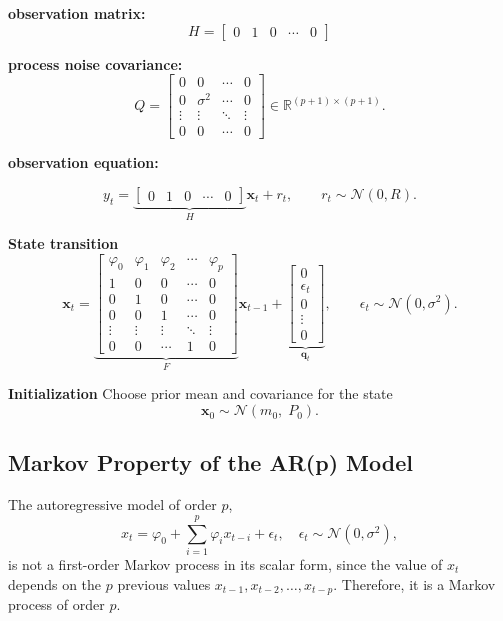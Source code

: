 \textbf{observation matrix:}
\[
H =
\begin{bmatrix}
0 & 1 & 0 & \cdots & 0
\end{bmatrix}
\]

\textbf{process noise covariance:}
\[
Q =
\begin{bmatrix}
0 & 0 & \cdots & 0 \\
0 & \sigma^2 & \cdots & 0 \\
\vdots & \vdots & \ddots & \vdots \\
0 & 0 & \cdots & 0
\end{bmatrix}
\in \mathbb{R}^{(p+1)\times(p+1)}.
\]

\textbf{observation equation:}

\[
y_t =
\underbrace{\begin{bmatrix}
0 & 1 & 0 & \cdots & 0
\end{bmatrix}}_{\displaystyle H}
\mathbf{x}_t + r_t,
\qquad
r_t \sim \mathcal{N}(0,R).
\]

\textbf{State transition}
\[
\mathbf{x}_t =
\underbrace{
\begin{bmatrix}
\varphi_0 & \varphi_1 & \varphi_2 & \cdots & \varphi_p \\
1 & 0 & 0 & \cdots & 0 \\
0 & 1 & 0 & \cdots & 0 \\
0 & 0 & 1 & \cdots & 0 \\
\vdots & \vdots & \vdots & \ddots & \vdots \\
0 & 0 & \cdots & 1& 0 
\end{bmatrix}
}_{\displaystyle F}
\mathbf{x}_{t-1}
+
\underbrace{
\begin{bmatrix}
0 \\
\epsilon_t \\
0 \\
\vdots \\
0
\end{bmatrix}
}_{\displaystyle \mathbf{q}_t},
\qquad \epsilon_t \sim \mathcal{N}(0,\sigma^2).
\]



\textbf{Initialization}
Choose prior mean and covariance for the state
\[
\mathbf{x}_0 \sim \mathcal{N}(m_0,\; P_0).
\]


\subsection*{Markov Property of the AR(p) Model} %

The autoregressive model of order \(p\),
\[
x_t = \varphi_0 + \sum_{i=1}^{p} \varphi_i x_{t-i} + \epsilon_t,
\quad \epsilon_t \sim \mathcal{N}(0, \sigma^2),
\]
is not a first-order Markov process in its scalar form, since the value of \(x_t\) depends on the \(p\) previous values \(x_{t-1}, x_{t-2}, \dots, x_{t-p}\). Therefore, it is a Markov process of order \(p\).

